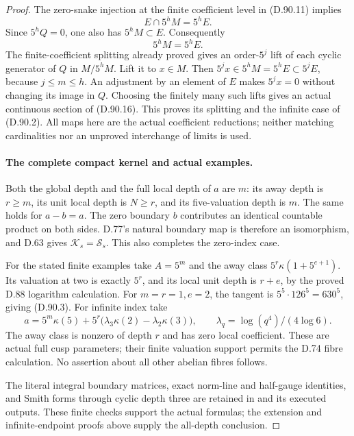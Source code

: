 \begin{proof}
The zero-snake injection at the finite coefficient level in
(D.90.11) implies
\[
                         E\cap5^hM=5^hE.
\]
Since \(5^hQ=0\), one also has \(5^hM\subset E\).
Consequently
\[
                              5^hM=5^hE.               \tag{D.90.18}
\]
The finite-coefficient splitting already proved gives an
order-\(5^j\) lift of each cyclic generator of \(Q\)
in \(M/5^hM\). Lift it to \(x\in M\). Then
\(5^j x\in5^hM=5^hE\subset5^jE\), because \(j\le m\le h\).
An adjustment by an element of \(E\) makes \(5^j x=0\)
without changing its image in \(Q\). Choosing the finitely
many such lifts gives an actual continuous section of
(D.90.16). This proves its splitting and the infinite case
of (D.90.2). All maps here are the actual coefficient
reductions; neither matching cardinalities nor an unproved
interchange of limits is used.

\paragraph{The complete compact kernel and actual examples.}
Both the global depth and the full local depth of \(a\)
are \(m\): its away depth is \(r\ge m\), its unit local
depth is \(N\ge r\), and its five-valuation depth is
\(m\). The same holds for \(a-b=a\). The zero boundary
\(b\) contributes an identical countable product on both
sides. D.77's natural boundary map is therefore an
isomorphism, and D.63 gives \(\mathcal K_s=\mathcal S_s\).
This also completes the zero-index case.

For the stated finite examples take \(A=5^m\) and the
away class \(5^r\kappa(1+5^{e+1})\). Its valuation at
two is exactly \(5^r\), and its local unit depth is
\(r+e\), by the proved D.88 logarithm calculation.
For \(m=r=1,e=2\), the tangent is
\(5^5\cdot126^5=630^5\), giving (D.90.3).
For infinite index take
\[
 a=5^m\kappa(5)+
    5^r\bigl(\lambda_3\kappa(2)-\lambda_2\kappa(3)\bigr),
 \qquad \lambda_q=\log(q^4)/(4\log6).
\]
The away class is nonzero of depth \(r\) and has zero
local coefficient. These are actual full cusp parameters;
their finite valuation support permits the D.74 fibre
calculation. No assertion about all other abelian fibres follows.

The literal integral boundary matrices, exact norm-line and
half-gauge identities, and Smith forms through cyclic depth
three are retained in 
and its executed outputs. These finite checks support the
actual formulas; the extension and infinite-endpoint proofs
above supply the all-depth conclusion.
\end{proof}
